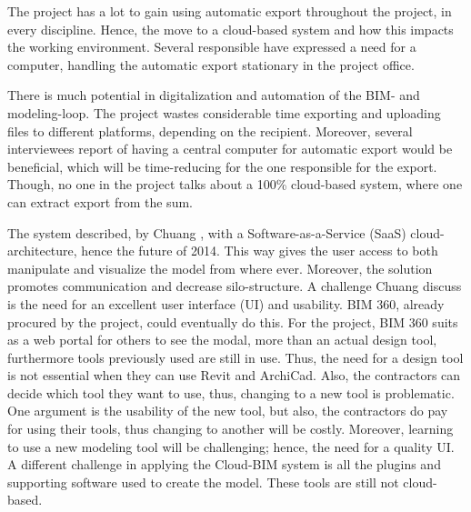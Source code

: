The project has a lot to gain using automatic export throughout the project, in every discipline. Hence, the move to a cloud-based system and how this impacts the working environment. Several responsible have expressed a need for a computer, handling the automatic export stationary in the project office. 

There is much potential in digitalization and automation of the BIM- and modeling-loop. The project wastes considerable time exporting and uploading files to different platforms, depending on the recipient. Moreover, several interviewees report of having a central computer for automatic export would be beneficial, which will be time-reducing for the one responsible for the export. Though, no one in the project talks about a 100\% cloud-based system, where one can extract export from the sum. 

The system described, by Chuang \citep{chuang2011applying}, with a Software-as-a-Service (SaaS) cloud-architecture, hence the future of 2014. This way gives the user access to both manipulate and visualize the model from where ever. Moreover, the solution promotes communication and decrease silo-structure. A challenge Chuang discuss is the need for an excellent user interface (UI) and usability. BIM 360, already procured by the project, could eventually do this. For the project, BIM 360 suits as a web portal for others to see the modal, more than an actual design tool, furthermore tools previously used are still in use. Thus, the need for a design tool is not essential when they can use Revit and ArchiCad. Also, the contractors can decide which tool they want to use, thus, changing to a new tool is problematic. One argument is the usability of the new tool, but also, the contractors do pay for using their tools, thus changing to another will be costly. Moreover, learning to use a new modeling tool will be challenging; hence, the need for a quality UI. A different challenge in applying the Cloud-BIM system is all the plugins and supporting software used to create the model. These tools are still not cloud-based.

